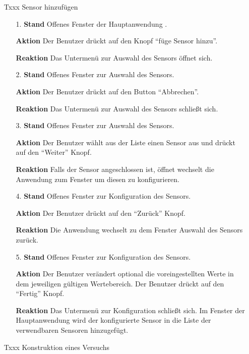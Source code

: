 \documentclass[parskip=full]{scrartcl}
\begin{document}
\begin{itemize}
\begin{itemize}
\end{itemize}

\item[Txxx] Sensor hinzufügen 
\begin{itemize}

\item[1.]\textbf{ Stand} Offenes Fenster der Hauptanwendung .
\item[]\textbf{Aktion} Der Benutzer drückt auf den Knopf "`füge Sensor hinzu"'.
\item[]\textbf{Reaktion} Das Untermenü zur Auswahl des Sensors öffnet sich.


\item[2.]\textbf{ Stand} Offenes Fenster zur Auswahl des Sensors.
\item[]\textbf {Aktion} Der Benutzer drückt auf den Button "`Abbrechen"'.
\item[]\textbf{Reaktion} Das Untermenü zur Auswahl des Sensors schließt sich.

\item[3.]\textbf{ Stand} Offenes Fenster zur Auswahl des Sensors.
\item[]\textbf{Aktion} Der Benutzer wählt aus der Liste einen Sensor aus und drückt auf den "`Weiter"' Knopf.
\item[]\textbf{Reaktion} Falls der Sensor angeschlossen ist, öffnet wechselt die Anwendung zum Fenster um diesen zu konfigurieren. 

\item[4.]\textbf{Stand} Offenes Fenster zur Konfiguration des Sensors.
\item[]\textbf{Aktion} Der Benutzer drückt auf den "`Zurück"' Knopf.
\item[]\textbf{Reaktion} Die Anwendung wechselt zu dem Fenster Auswahl des Sensors zurück.

\item[5.]\textbf{ Stand} Offenes Fenster zur Konfiguration des Sensors.
\item[]\textbf{Aktion} Der Benutzer verändert optional die voreingestellten Werte in dem jeweiligen gültigen Wertebereich. Der Benutzer drückt auf den "`Fertig"' Knopf.
\item[]\textbf{Reaktion} Das Untermenü zur Konfiguration schließt sich. Im Fenster der Hauptanwendung wird der konfigurierte Sensor in die Liste der verwendbaren Sensoren hinzugefügt.
\end{itemize}

\item[Txxx] Konstruktion eines Versuchs
\begin{itemize}


\end{itemize}
\end{itemize}
\end{document}
